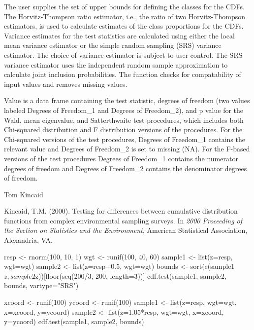 \begin{Details}\relax
The user supplies the set of upper bounds for defining the classes for the
CDFs.  The Horvitz-Thompson ratio estimator, i.e., the ratio of two
Horvitz-Thompson estimators, is used to calculate estimates of the class
proportions for the CDFs.  Variance estimates for the test statistics are
calculated using either the local mean variance estimator or the simple random
sampling (SRS) variance estimator.  The choice of variance estimator is
subject to user control.  The SRS variance estimator uses the
independent random sample approximation to calculate joint inclusion
probabilities.  The function checks for compatability of input values and
removes missing values.
\end{Details}
\begin{Value}
Value is a data frame containing the test statistic, degrees of 
freedom (two values labeled Degrees of Freedom\_1 and Degrees of  Freedom\_2),
and p value for the Wald, mean eigenvalue, and Satterthwaite test procedures,
which includes both Chi-squared distribution and F  distribution versions of 
the procedures.  For the Chi-squared versions of  the test procedures, Degrees
of Freedom\_1 contains the relevant value  and Degrees of Freedom\_2 is set to 
missing (NA).  For the F-based  versions of the test procedures Degrees of 
Freedom\_1 contains the  numerator degrees of freedom and Degrees of 
Freedom\_2 contains the  denominator degrees of freedom.
\end{Value}
\begin{Author}\relax
Tom Kincaid 
\end{Author}
\begin{References}\relax
Kincaid, T.M. (2000). Testing for differences between cumulative distribution
functions from complex environmental sampling surveys.  In \emph{2000
Proceeding of the Section on Statistics and the Environment}, American
Statistical Association, Alexandria, VA.
\end{References}
\begin{Examples}
\begin{ExampleCode}
resp <- rnorm(100, 10, 1)
wgt <- runif(100, 40, 60)
sample1 <- list(z=resp, wgt=wgt)
sample2 <- list(z=resp+0.5, wgt=wgt)
bounds <- sort(c(sample1$z, sample2$z))[floor(seq(200/3, 200, length=3))]
cdf.test(sample1, sample2, bounds, vartype="SRS")

xcoord <- runif(100)
ycoord <- runif(100)
sample1 <- list(z=resp, wgt=wgt, x=xcoord, y=ycoord)
sample2 <- list(z=1.05*resp, wgt=wgt, x=xcoord, y=ycoord)
cdf.test(sample1, sample2, bounds)
\end{ExampleCode}
\end{Examples}

